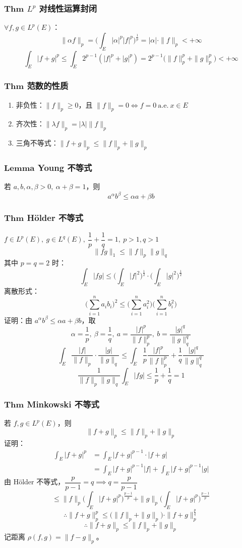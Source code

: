 \documentclass{article}
\begin{document}
	\subsubsection{$\bm{Thm}$ $L^p$ 对线性运算封闭}
	$\forall f,g\in L^p(E)$：
	\[
	\|\alpha f\|_p = \Big(\int_E |\alpha|^p |f|^p\Big)^{\frac1p} = |\alpha|\cdot\|f\|_p < +\infty
	\]
	\[
	\int_E |f+g|^p \le \int_E 2^{p-1}(|f|^p+|g|^p) = 2^{p-1}\big(\|f\|_p^p+\|g\|_p^p\big) < +\infty
	\]
	
	\subsubsection{$\bm{Thm}$ 范数的性质}
	\begin{enumerate}
		\item 非负性：$\|f\|_p\ge0$，且 $\|f\|_p=0 \iff f=0\ \text{a.e.}\ x\in E$
		\item 齐次性：$\|\lambda f\|_p = |\lambda|\|f\|_p$
		\item 三角不等式：$\|f+g\|_p \le \|f\|_p+\|g\|_p$
	\end{enumerate}
	
	\subsubsection{$\bm{Lemma}$ Young 不等式}
	若 $a,b,\alpha,\beta>0,\ \alpha+\beta=1$，则
	\[
	a^\alpha b^\beta \le \alpha a+\beta b
	\]
	
	\subsubsection{$\bm{Thm}$ Hölder 不等式}
	$f\in L^p(E),\ g\in L^q(E),\ \dfrac1p+\dfrac1q=1,\ p>1,q>1$
	\[
	\|fg\|_1 \le \|f\|_p \|g\|_q
	\]
	其中 $p=q=2$ 时：
	\[
	\int_E |fg| \le \Big(\int_E |f|^2\Big)^{\frac12}\cdot\Big(\int_E |g|^2\Big)^{\frac12}
	\]
	离散形式：
	\[
	\Big(\sum_{i=1}^n a_i b_i\Big)^2 \le \Big(\sum_{i=1}^n a_i^2\Big)\Big(\sum_{i=1}^n b_i^2\Big)
	\]
	证明：由 $a^\alpha b^\beta \le \alpha a+\beta b$，取
	\[
	\alpha=\frac1p,\ \beta=\frac1q,\ a=\frac{|f|^p}{\|f\|_p^p},\ b=\frac{|g|^q}{\|g\|_q^q}
	\]
	\[
	\int_E \frac{|f|}{\|f\|_p}\cdot\frac{|g|}{\|g\|_q}
	\le \int_E \frac1p\frac{|f|^p}{\|f\|_p^p} + \frac1q\frac{|g|^q}{\|g\|_q^q}
	\]
	\[
	\frac{1}{\|f\|_p\|g\|_q}\int_E |fg| \le \frac1p+\frac1q = 1
	\]
	
	\subsubsection{$\bm{Thm}$ Minkowski 不等式}
	若 $f,g\in L^p(E)$，则
	\[
	\|f+g\|_p \le \|f\|_p+\|g\|_p
	\]
	证明：
	\[
	\begin{aligned}
		\int_E |f+g|^p &= \int_E |f+g|^{p-1}\cdot|f+g| \\
		&= \int_E |f+g|^{p-1}|f| + \int_E |f+g|^{p-1}|g|
	\end{aligned}
	\]
	由 Hölder 不等式，$\dfrac{p}{p-1}=q \implies q = \dfrac{p}{p-1}$
	\[
	\le \|f\|_p \Big(\int_E |f+g|^p\Big)^{\frac{p-1}{p}} + \|g\|_p \Big(\int_E |f+g|^p\Big)^{\frac{p-1}{p}}
	\]
	\[
	\therefore \|f+g\|_p^p \le \big(\|f\|_p+\|g\|_p\big)\cdot\|f+g\|_p^{\frac{p}{q}}
	\]
	\[
	\therefore \|f+g\|_p \le \|f\|_p+\|g\|_p
	\]
	记距离 $\rho(f,g)=\|f-g\|_p$。
	
\end{document}
